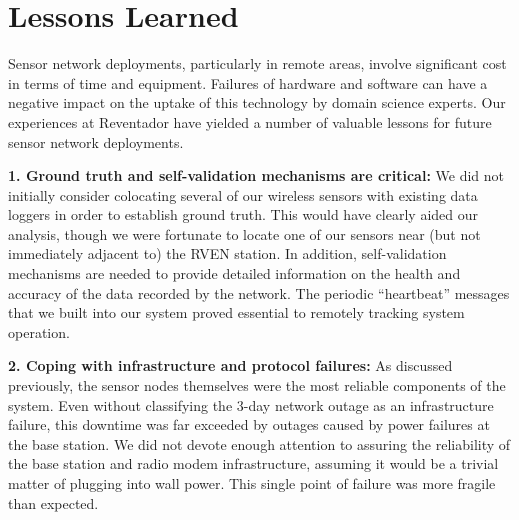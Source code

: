 \section{Lessons Learned}
\label{evaluation-sec-lessons}

Sensor network deployments, particularly in remote areas, involve significant
cost in terms of time and equipment. Failures of hardware and software can
have a negative impact on the uptake of this technology by domain science
experts. Our experiences at Reventador have yielded a number of valuable
lessons for future sensor network deployments. 


{\bf 1. Ground truth and self-validation mechanisms are critical:} We did not
initially consider colocating several of our wireless sensors with existing
data loggers in order to establish ground truth. This would have clearly
aided our analysis, though we were fortunate to locate one of our sensors
near (but not immediately adjacent to) the RVEN station.
In addition, self-validation mechanisms are needed to provide detailed
information on the health and accuracy of the data recorded by the network.
The periodic ``heartbeat'' messages that we built into our system proved
essential to remotely tracking system operation.

{\bf 2. Coping with infrastructure and protocol failures:} As discussed
previously, the sensor nodes themselves were the most reliable components of
the system. Even without classifying the 3-day network outage as an
infrastructure failure, this downtime was far exceeded by outages caused by
power failures at the base station. 
We did not devote enough attention to assuring the reliability of the base
station and radio modem infrastructure, assuming it would be a trivial matter
of plugging into wall power. This single point of failure was more fragile
than expected.

